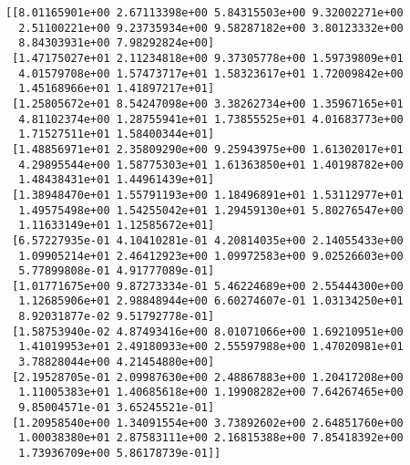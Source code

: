 \documentclass[11pt]{article}
\begin{document}
    \begin{Verbatim}[commandchars=\\\{\}]
[[8.01165901e+00 2.67113398e+00 5.84315503e+00 9.32002271e+00
  2.51100221e+00 9.23735934e+00 9.58287182e+00 3.80123332e+00
  8.84303931e+00 7.98292824e+00]
 [1.47175027e+01 2.11234818e+00 9.37305778e+00 1.59739809e+01
  4.01579708e+00 1.57473717e+01 1.58323617e+01 1.72009842e+00
  1.45168966e+01 1.41897217e+01]
 [1.25805672e+01 8.54247098e+00 3.38262734e+00 1.35967165e+01
  4.81102374e+00 1.28755941e+01 1.73855525e+01 4.01683773e+00
  1.71527511e+01 1.58400344e+01]
 [1.48856971e+01 2.35809290e+00 9.25943975e+00 1.61302017e+01
  4.29895544e+00 1.58775303e+01 1.61363850e+01 1.40198782e+00
  1.48438431e+01 1.44961439e+01]
 [1.38948470e+01 1.55791193e+00 1.18496891e+01 1.53112977e+01
  1.49575498e+00 1.54255042e+01 1.29459130e+01 5.80276547e+00
  1.11633149e+01 1.12585672e+01]
 [6.57227935e-01 4.10410281e-01 4.20814035e+00 2.14055433e+00
  1.09905214e+01 2.46412923e+00 1.09972583e+00 9.02526603e+00
  5.77899808e-01 4.91777089e-01]
 [1.01771675e+00 9.87273334e-01 5.46224689e+00 2.55444300e+00
  1.12685906e+01 2.98848944e+00 6.60274607e-01 1.03134250e+01
  8.92031877e-02 9.51792778e-01]
 [1.58753940e-02 4.87493416e+00 8.01071066e+00 1.69210951e+00
  1.41019953e+01 2.49180933e+00 2.55597988e+00 1.47020981e+01
  3.78828044e+00 4.21454880e+00]
 [2.19528705e-01 2.09987630e+00 2.48867883e+00 1.20417208e+00
  1.11005383e+01 1.40685618e+00 1.19908282e+00 7.64267465e+00
  9.85004571e-01 3.65245521e-01]
 [1.20958540e+00 1.34091554e+00 3.73892602e+00 2.64851760e+00
  1.00038380e+01 2.87583111e+00 2.16815388e+00 7.85418392e+00
  1.73936709e+00 5.86178739e-01]]

    \end{Verbatim}
\end{document}
